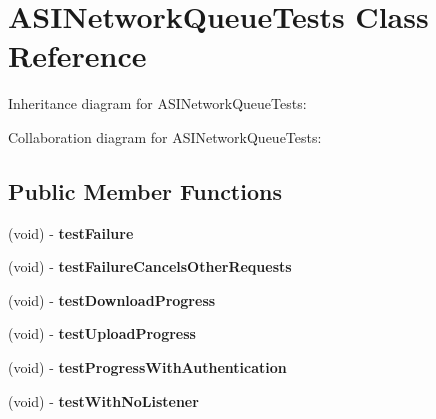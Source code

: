 \hypertarget{interface_a_s_i_network_queue_tests}{
\section{\-A\-S\-I\-Network\-Queue\-Tests \-Class \-Reference}
\label{interface_a_s_i_network_queue_tests}
}


\-Inheritance diagram for \-A\-S\-I\-Network\-Queue\-Tests\-:


\-Collaboration diagram for \-A\-S\-I\-Network\-Queue\-Tests\-:
\subsection*{\-Public \-Member \-Functions}
\begin{DoxyCompactItemize}
\item 
\hypertarget{interface_a_s_i_network_queue_tests_a676be0402a758bbd669e8b11f7bb368d}{
(void) -\/ {\bfseries test\-Failure}}
\label{interface_a_s_i_network_queue_tests_a676be0402a758bbd669e8b11f7bb368d}

\item 
\hypertarget{interface_a_s_i_network_queue_tests_a1d3ea45df0ebc0597e234c1a2fa3c35b}{
(void) -\/ {\bfseries test\-Failure\-Cancels\-Other\-Requests}}
\label{interface_a_s_i_network_queue_tests_a1d3ea45df0ebc0597e234c1a2fa3c35b}

\item 
\hypertarget{interface_a_s_i_network_queue_tests_a59b48bbf964a2a4ac6626270d519748a}{
(void) -\/ {\bfseries test\-Download\-Progress}}
\label{interface_a_s_i_network_queue_tests_a59b48bbf964a2a4ac6626270d519748a}

\item 
\hypertarget{interface_a_s_i_network_queue_tests_a75e8fb03b62a4a3c8be34b64407c508a}{
(void) -\/ {\bfseries test\-Upload\-Progress}}
\label{interface_a_s_i_network_queue_tests_a75e8fb03b62a4a3c8be34b64407c508a}

\item 
\hypertarget{interface_a_s_i_network_queue_tests_aa1ec111c87e8672ac36cf638d41acb23}{
(void) -\/ {\bfseries test\-Progress\-With\-Authentication}}
\label{interface_a_s_i_network_queue_tests_aa1ec111c87e8672ac36cf638d41acb23}

\item 
\hypertarget{interface_a_s_i_network_queue_tests_a3ed1658a28f4bc0ac237d7c3793f53f1}{
(void) -\/ {\bfseries test\-With\-No\-Listener}}
\label{interface_a_s_i_network_queue_tests_a3ed1658a28f4bc0ac237d7c3793f53f1}


\end{DoxyCompactItemize}
